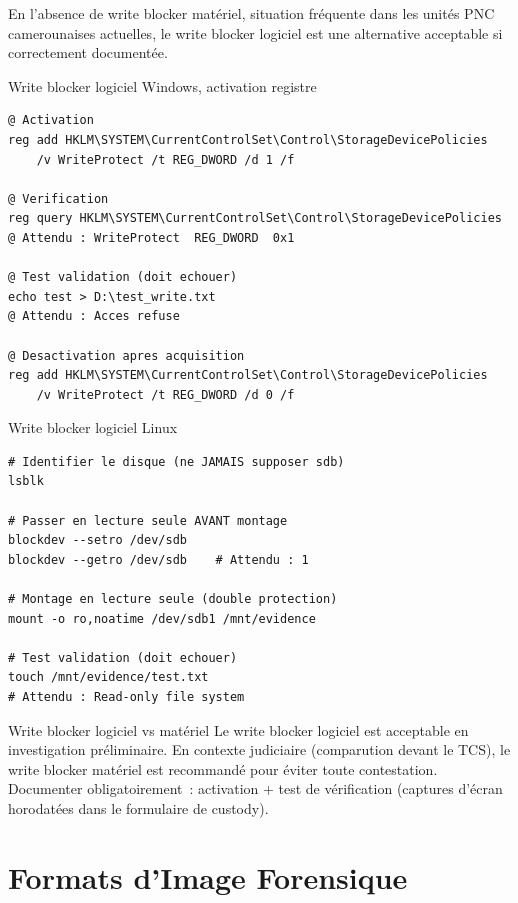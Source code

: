 En l'absence de write blocker matériel, situation fréquente dans les
unités PNC camerounaises actuelles, le write blocker logiciel est une
alternative acceptable si correctement documentée.

\begin{boxoutils}{Write blocker logiciel Windows, activation registre}
\begin{lstlisting}[language=bash_forensique]
@ Activation
reg add HKLM\SYSTEM\CurrentControlSet\Control\StorageDevicePolicies
    /v WriteProtect /t REG_DWORD /d 1 /f

@ Verification
reg query HKLM\SYSTEM\CurrentControlSet\Control\StorageDevicePolicies
@ Attendu : WriteProtect  REG_DWORD  0x1

@ Test validation (doit echouer)
echo test > D:\test_write.txt
@ Attendu : Acces refuse

@ Desactivation apres acquisition
reg add HKLM\SYSTEM\CurrentControlSet\Control\StorageDevicePolicies
    /v WriteProtect /t REG_DWORD /d 0 /f
\end{lstlisting}
\end{boxoutils}

\begin{boxoutils}{Write blocker logiciel Linux}
\begin{lstlisting}[language=bash_forensique]
# Identifier le disque (ne JAMAIS supposer sdb)
lsblk

# Passer en lecture seule AVANT montage
blockdev --setro /dev/sdb
blockdev --getro /dev/sdb    # Attendu : 1

# Montage en lecture seule (double protection)
mount -o ro,noatime /dev/sdb1 /mnt/evidence

# Test validation (doit echouer)
touch /mnt/evidence/test.txt
# Attendu : Read-only file system
\end{lstlisting}
\end{boxoutils}

\begin{boiteRemarque}{Write blocker logiciel vs matériel}
Le write blocker logiciel est acceptable en investigation préliminaire.
En contexte judiciaire (comparution devant le TCS), le write blocker
matériel est recommandé pour éviter toute contestation. Documenter
obligatoirement~: activation + test de vérification (captures d'écran
horodatées dans le formulaire de custody).
\end{boiteRemarque}

\section{Formats d'Image Forensique}
\label{sec:formats-image}

